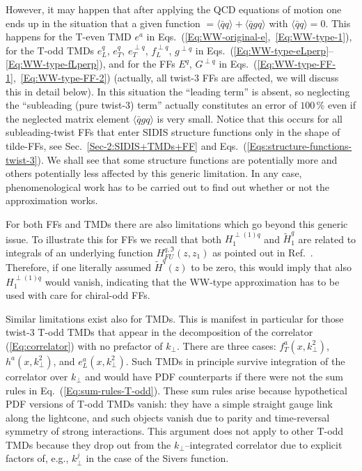 \documentclass[a4paper,11pt]{article}
\newcommand{\la}{\langle}
\newcommand{\ra}{\rangle}
\def\kperp{k_\perp}
\begin{document}
However, it may happen that after applying the QCD equations
of motion one ends up in the situation that a given function
$=\la\bar{q}q\ra + \la\bar{q}gq\ra$ with $\la\bar{q}q\ra = 0$.
This happens for the T-even TMD
	$e^a$ in Eqs.~(\ref{Eq:WW-original-e},~\ref{Eq:WW-type-1}),
for the T-odd TMDs
	$e_L^q$,
	$e_T^q$,
	$e_T^{\perp q}$,
	$f_L^{\perp q}$,
	$g^{\perp q}$ in Eqs.~(\ref{Eq:WW-type-eLperp}--\ref{Eq:WW-type-fLperp}),
and for the FFs
	$E^q$,
	$G^{\perp q}$ in Eqs.~(\ref{Eq:WW-type-FF-1},~\ref{Eq:WW-type-FF-2})
(actually, all twist-3 FFs are affected, we will discuss this in detail below).
In this situation the ``leading term'' is absent, so neglecting the
``subleading (pure twist-3) term'' actually constitutes an error of $100\,\%$
even if the neglected matrix element  $\la\bar{q}gq\ra$ is very small.
Notice that this occurs for all subleading-twist FFs that enter
SIDIS structure functions only in the shape of tilde-FFs, see
Sec.~\ref{Sec-2:SIDIS+TMDs+FF} and
Eqs.~(\ref{Eqs:structure-functions-twist-3}).
We shall see that some structure functions are potentially more and
others potentially less affected by this generic limitation. In any
case, phenomenological work has to be carried out to find out whether
or not the approximation works.


For both FFs and TMDs there are also limitations
which go beyond this generic issue. To illustrate this for FFs
we recall that both $H_1^{\perp(1)q}$ and $\tilde H_1^{q}$ are
related to integrals of an underlying function $H_{FU}^{q,\Im}(z,z_1)$
as pointed out in Ref.~\cite{Kanazawa:2015ajw}. Therefore, if one
literally assumed $\tilde H^q(z)$ to be zero, this would imply that
also $H_1^{\perp(1)q}$ would vanish, indicating that the WW-type
approximation has to be used with care for chiral-odd FFs.

Similar limitations exist also for TMDs. This is manifest in particular
for those twist-3 T-odd TMDs that appear in the decomposition of the
correlator (\ref{Eq:correlator}) with no prefactor of $\kperp$.
There are three cases: $f_T^a(x,k_\perp^{2})$, $h^a(x,\kperp^{2})$, and $e_L^a(x,\kperp^{2})$.
Such TMDs in principle survive integration of the correlator over $\kperp$
and would have PDF counterparts if there were not the sum rules in
Eq.~(\ref{Eq:sum-rules-T-odd}). These sum rules arise because hypothetical
PDF versions of T-odd TMDs vanish: they have a simple straight gauge link
along the lightcone, and such objects vanish due to parity and time-reversal
symmetry of strong interactions. This argument does not apply to other T-odd
TMDs because they drop out from the $\kperp$--integrated correlator due to
explicit factors of, e.g., $\kperp^j$ in the case of the Sivers function.
\end{document}
